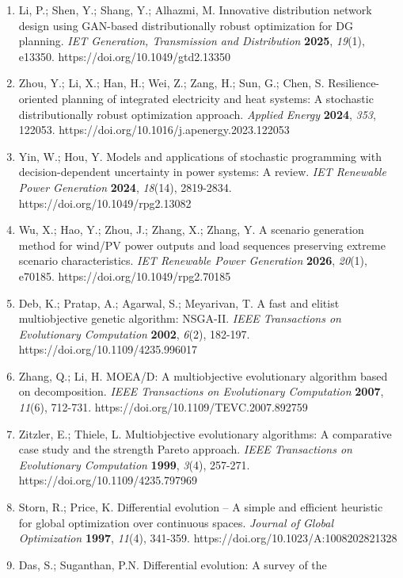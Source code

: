 \documentclass[
  10pt,
  a4paper,
]{article}
\begin{document}
\begin{enumerate}
\item
  Li, P.; Shen, Y.; Shang, Y.; Alhazmi, M. Innovative distribution
  network design using GAN-based distributionally robust optimization
  for DG planning. \emph{IET Generation, Transmission and Distribution}
  \textbf{2025}, \emph{19}(1), e13350.
  https://doi.org/10.1049/gtd2.13350
\item
  Zhou, Y.; Li, X.; Han, H.; Wei, Z.; Zang, H.; Sun, G.; Chen, S.
  Resilience-oriented planning of integrated electricity and heat
  systems: A stochastic distributionally robust optimization approach.
  \emph{Applied Energy} \textbf{2024}, \emph{353}, 122053.
  https://doi.org/10.1016/j.apenergy.2023.122053
\item
  Yin, W.; Hou, Y. Models and applications of stochastic programming
  with decision-dependent uncertainty in power systems: A review.
  \emph{IET Renewable Power Generation} \textbf{2024}, \emph{18}(14),
  2819-2834. https://doi.org/10.1049/rpg2.13082
\item
  Wu, X.; Hao, Y.; Zhou, J.; Zhang, X.; Zhang, Y. A scenario generation
  method for wind/PV power outputs and load sequences preserving extreme
  scenario characteristics. \emph{IET Renewable Power Generation}
  \textbf{2026}, \emph{20}(1), e70185.
  https://doi.org/10.1049/rpg2.70185
\item
  Deb, K.; Pratap, A.; Agarwal, S.; Meyarivan, T. A fast and elitist
  multiobjective genetic algorithm: NSGA-II. \emph{IEEE Transactions on
  Evolutionary Computation} \textbf{2002}, \emph{6}(2), 182-197.
  https://doi.org/10.1109/4235.996017
\item
  Zhang, Q.; Li, H. MOEA/D: A multiobjective evolutionary algorithm
  based on decomposition. \emph{IEEE Transactions on Evolutionary
  Computation} \textbf{2007}, \emph{11}(6), 712-731.
  https://doi.org/10.1109/TEVC.2007.892759
\item
  Zitzler, E.; Thiele, L. Multiobjective evolutionary algorithms: A
  comparative case study and the strength Pareto approach. \emph{IEEE
  Transactions on Evolutionary Computation} \textbf{1999}, \emph{3}(4),
  257-271. https://doi.org/10.1109/4235.797969
\item
  Storn, R.; Price, K. Differential evolution -- A simple and efficient
  heuristic for global optimization over continuous spaces.
  \emph{Journal of Global Optimization} \textbf{1997}, \emph{11}(4),
  341-359. https://doi.org/10.1023/A:1008202821328
\item
  Das, S.; Suganthan, P.N. Differential evolution: A survey of the

\end{enumerate}
\end{document}
